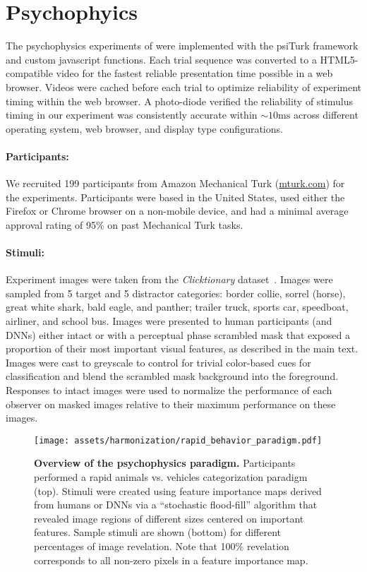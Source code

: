 \section{Psychophyics}\label{si_sec:psychophysics}

The psychophysics experiments of  were implemented with the psiTurk framework \cite{Gureckis2016-if} and custom javascript functions. Each trial sequence was converted to a HTML5-compatible video for the fastest reliable presentation time possible in a web browser. Videos were cached before each trial to optimize reliability of experiment timing within the web browser. A photo-diode verified the reliability of stimulus timing in our experiment was consistently accurate within $\sim10\mathrm{ms}$ across different operating system, web browser, and display type configurations.

\paragraph{Participants:} We recruited 199 participants from Amazon Mechanical Turk (\url{mturk.com}) for the experiments. Participants were based in the United States, used either the Firefox or Chrome browser on a non-mobile device, and had a minimal average approval rating of 95\% on past Mechanical Turk tasks. 

\paragraph{Stimuli:} Experiment images were taken from the \textit{Clicktionary} dataset~\cite{Linsley2017-qe}. Images were sampled from 5 target and 5 distractor categories: border collie, sorrel (horse), great white shark, bald eagle, and panther; trailer truck, sports car, speedboat, airliner, and school bus. Images were presented to human participants (and DNNs) either intact or with a perceptual phase scrambled mask that exposed a proportion of their most important visual features, as described in the main text. Images were cast to greyscale to control for trivial color-based cues for classification and blend the scrambled mask background into the foreground. Responses to intact images were used to normalize the performance of each observer on masked images relative to their maximum performance on these images.


\begin{figure}[h!]
\begin{center}
   \texttt{[image: assets/harmonization/rapid\_behavior\_paradigm.pdf]}
\end{center}
   \caption{\textbf{Overview of the psychophysics paradigm.} Participants performed a rapid animals vs. vehicles categorization paradigm (top). Stimuli were created using feature importance maps derived from humans or DNNs via a ``stochastic flood-fill'' algorithm that revealed image regions of different sizes centered on important features. Sample stimuli are shown (bottom) for different percentages of image revelation. Note that 100\% revelation corresponds to all non-zero pixels in a feature importance map.}
\label{si_fig:psychophysics}
\end{figure}


